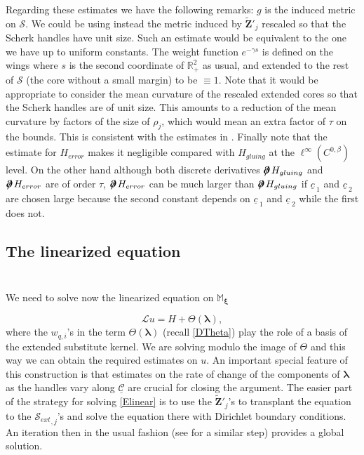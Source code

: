 \documentclass[12pt,namelimits,sumlimits]{amsart}
\theoremstyle{remark}
\numberwithin{equation}{section}
\begin{document}
Regarding these estimates we have the following remarks:
$g$ is the induced metric on ${{\mathcal{S}}}$.
We could be using instead the metric induced by ${\widetilde{\boldsymbol{Z}}}'_j$
rescaled so that the Scherk handles have unit size.
Such an estimate would be equivalent to the one we have up to uniform constants.
The weight function 
$e^{-\gamma s}$ is defined on the wings where $s$ is the second coordinate of ${{{\mathbb{R}}^2_+}}$ as usual,
and extended to the rest of ${{\mathcal{S}}}$ (the core without a small margin)
to be $\equiv1$.
Note that it would be appropriate to consider the mean curvature of the rescaled extended cores
so that the Scherk handles are of unit size.
This amounts to a reduction of the mean curvature by factors of the size of $\rho_j$,
which would mean an extra factor of $\tau$ on the bounds.
This is consistent with the estimates in \cite{kapouleas:finite}.
Finally note that the estimate for ${{H_{error}}}$ makes it negligible compared with ${{H_{gluing}}}$
at the $\ell^\infty(C^{0,\beta})$ level.
On the other hand although both discrete derivatives ${{\boldsymbol{\partial}\mspace{.8mu}\!\!\!\!\boldsymbol{/}\,}} {{H_{gluing}}}$ and ${{\boldsymbol{\partial}\mspace{.8mu}\!\!\!\!\boldsymbol{/}\,}}{{H_{error}}}$ are of order $\tau$,
${{\boldsymbol{\partial}\mspace{.8mu}\!\!\!\!\boldsymbol{/}\,}}{{H_{error}}}$ can be much larger than ${{\boldsymbol{\partial}\mspace{.8mu}\!\!\!\!\boldsymbol{/}\,}} {{H_{gluing}}}$ if ${\underline{c}\,}_1$ and ${\underline{c}\,}_2$ are chosen large
because the second constant depends on ${\underline{c}\,}_1$ and ${\underline{c}\,}_2$ while the first does not.

\subsection*{The linearized equation}
$\phantom{ab}$
\nopagebreak

We need to solve now the linearized equation on ${\mathbb{M}}_{{\boldsymbol{\xi}}}$
\addtocounter{theorem}{1}
\begin{equation}
\label{Elinear}
{\ensuremath{\mathcal L}} u= H + \Theta({\boldsymbol{\lambda}}),
\end{equation}
where the $w_{q,i}$'s in the term $\Theta({\boldsymbol{\lambda}})$
(recall \ref{DTheta})
play the role of a basis of the extended substitute kernel.
We are solving modulo the image of $\Theta$ and this way we can obtain the required estimates on $u$.
An important special feature of this construction is that estimates on the rate of change of 
the components of ${\boldsymbol{\lambda}}$ as the handles vary along ${\underline{{\mathcal{C}}}}$ are crucial for closing the argument.
The easier part of the strategy for solving \ref{Elinear}
is to use the ${\widetilde{\boldsymbol{Z}}}'_j$'s to transplant the equation to the 
${{\mathcal{S}_{ext}}}_{,j}$'s
and solve the equation there with Dirichlet boundary conditions.
An iteration then in the usual fashion (see \cite{kapouleas:finite} for a similar step)
provides a global solution.
\end{document}
